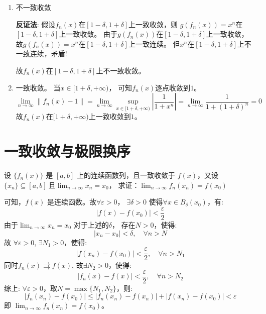 \begin{solution}
\begin{enumerate}
        \item 不一致收敛

            \textbf{反证法}:
            假设\(f_{n}(x)\)在\([1-\delta,1+\delta]\)上一致收敛，则
            \(g(f_n(x))=x^{n}\)在\([1-\delta,1+\delta]\)上一致收敛。
            由于\(g(f_n(x))\)在\([1-\delta,1+\delta]\)上一致收敛，
            故\(g(f_n(x)) = x^{n}\)在\([1-\delta,1+\delta]\)上一致连续。
            但\(x^{n}\)在\([1-\delta,1+\delta]\)上不一致连续，矛盾!

            故\(f_{n}(x)\)在\([1-\delta,1+\delta]\)上不一致收敛。

        \item 一致收敛。
            当\(x \in [1+\delta,+\infty)\)，
            可知\(f_n(x)\)逐点收敛到\(1\)。%
            \[
                \lim_{n \to \infty} \left\lVert f_{n}(x) -
                1 \right\rVert
                = \lim_{n \to \infty} \sup_{x \in
                [1+\delta,+\infty)} \left\vert %
                \frac{1}{1 + x^{n}} \right\vert
                = \lim_{n \to \infty} \frac{1}{1+(1+\delta)^{n}} = 0
            \]
            故\(f_{n}(x)\)在\([1+\delta,+\infty)\)上一致收敛到\(1\)。%
    \end{enumerate}
\end{solution}

\section{一致收敛与极限换序}
\begin{problem}
    设 \(\{f_n(x)\}\) 是 \([a, b]\) 上的连续函数列，且一致收敛于 \(f(x)\)，又设\(\{x_n\}
    \subseteq [a, b] \ \)且\( \lim_{n \to \infty} x_n = x_0\)，
    求证：\(\lim_{n \to \infty} f_n(x_n) = f(x_0)\)
\end{problem}

\begin{solution}
    可知，\(f(x)\) 是连续函数。故\(\forall \varepsilon > 0\)，
    \(\exists \delta > 0\)
    使得\(\forall x \in B_{\delta}(x_{0})\)，有:
    \[
        \left| f(x)- f(x_{0}) \right| < \frac{\varepsilon}{2}
    \]
    由于\(\lim_{n \to \infty} x_{n}=x_{0}\) 对于上述的\(\delta\)，
    存在\(N>0\)，使得:
    \[
        \left| x_{n} - x_{0} \right| < \delta, \quad \forall n > N
    \]
    故 \(\forall \varepsilon > 0\), \(\exists N_1 > 0\)，使得:
    \[
        \left| f(x_{n})- f(x_{0}) \right| <
        \frac{\varepsilon}{2}, \quad
        \forall n > N_1
    \]
    同时\(f_{n}(x) \rightrightarrows f(x)\), 故\(\exists N_2 > 0\)，使得:
    \[
        \left| f_{n}(x) - f(x) \right| < \frac{\varepsilon}{2}, \quad
        \forall n > N_2
    \]
    综上: \(\forall \varepsilon > 0\)，取\(N = \max\{N_1, N_2\}\)，则:
    \[
        \left| f_{n}(x_{n}) - f(x_{0}) \right| \le \left|
        f_{n}(x_{n}) -
        f(x_{n}) \right| + \left| f(x_{n}) - f(x_{0})
        \right| < \varepsilon
    \]
    即 \(\lim_{n \to \infty} f_{n}(x_{n}) = f(x_{0})\)。
\end{solution}

